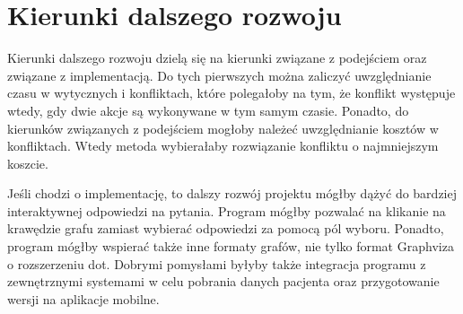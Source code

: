 \section{Kierunki dalszego rozwoju}


Kierunki dalszego rozwoju dzielą się na kierunki związane z podejściem oraz związane z implementacją. Do tych pierwszych można zaliczyć uwzględnianie czasu w wytycznych i konfliktach, które polegałoby na tym, że konflikt występuje wtedy, gdy dwie akcje są wykonywane w tym samym czasie. Ponadto, do kierunków związanych z podejściem mogłoby należeć uwzględnianie kosztów w konfliktach. Wtedy metoda wybierałaby rozwiązanie konfliktu o najmniejszym koszcie. 

Jeśli chodzi o implementację, to dalszy rozwój projektu mógłby dążyć do bardziej interaktywnej odpowiedzi na pytania. Program mógłby pozwalać na klikanie na krawędzie grafu zamiast wybierać odpowiedzi za pomocą 
pól wyboru. Ponadto, program mógłby wspierać także inne formaty grafów, nie tylko format Graphviza o rozszerzeniu dot. Dobrymi pomysłami byłyby także integracja programu z zewnętrznymi systemami w celu pobrania danych pacjenta oraz przygotowanie wersji na aplikacje mobilne.


